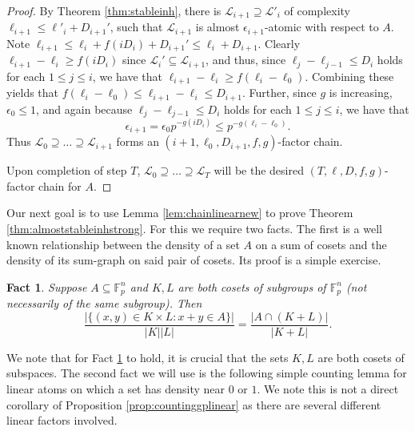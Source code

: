 \documentclass[12pt,oneside,british,a4wide]{amsart}
\newtheorem{fact}[theorem]{Fact}
\numberwithin{equation}{section}
\theoremstyle{definition}
\def\F{\mathbb{F}}
\def\e{\epsilon}
\newcommand{\calL}{\mathcal{L}}
\begin{document}
\begin{proof}
By Theorem \ref{thm:stableinh}, there is $\calL_{i+1}\supseteq \calL'_i$ of complexity $\ell_{i+1}\leq\ell'_i+D_{i+1}'$, such that $\calL_{i+1}$ is almost $\e_{i+1}$-atomic with respect to $A$. Note $\ell_{i+1}\leq \ell_i+f(iD_i)+D_{i+1}'\leq \ell_i+D_{i+1}$.  Clearly $\ell_{i+1}-\ell_i\geq f(iD_i)$ since $\calL_i'\subseteq \calL_{i+1}$, and thus, since $\ell_j-\ell_{j-1}\leq D_i$ holds for each $1\leq j\leq i$, we have that $\ell_{i+1}-\ell_i\geq f(\ell_i-\ell_0)$.  Combining these yields that $f(\ell_i-\ell_0)\leq \ell_{i+1}-\ell_i\leq D_{i+1}$.  Further, since $g$ is increasing, $\e_0\leq 1$, and again because $\ell_j-\ell_{j-1}\leq D_i$ holds for each $1\leq j\leq i$, we have that
$$
\e_{i+1}=\e_0 p^{-g(iD_i)}\leq p^{-g(\ell_i-\ell_{0})}.
$$
Thus  $\calL_0\supseteq \dots \supseteq \calL_{i+1}$ forms an $(i+1,\ell_0,D_{i+1},f,g)$-factor chain.

Upon completion of step $T$, $\calL_0\supseteq \ldots \supseteq \calL_T$ will be the desired $(T,\ell, D,f,g)$-factor chain for $A$.
\end{proof}

Our next goal is to use Lemma \ref{lem:chainlinearnew} to prove Theorem \ref{thm:almoststableinhstrong}. For this we require two facts.  The first is a well known relationship between the density of a set $A$ on a sum of cosets and the density of its sum-graph on said pair of cosets.  Its proof is a simple exercise.

\begin{fact}\label{fact:sumdensities}
Suppose $A\subseteq \F_p^n$ and $K, L$ are both cosets of subgroups of $\F_p^n$ (not necessarily of the same subgroup).  Then 
$$
\frac{|\{(x,y)\in K\times L: x+y\in A\}|}{|K||L|}=\frac{|A\cap (K+L)|}{|K+L|}.
$$
\end{fact}
We note that for  Fact \ref{fact:sumdensities} to hold,  it is crucial that the sets $K,L$ are both cosets of subspaces. The second fact we will use is the following   simple counting lemma for linear atoms on which a set has density near $0$ or $1$.  We note this is not a direct corollary of Proposition \ref{prop:countinggplinear} as there are several different linear factors involved.  
\end{document}
